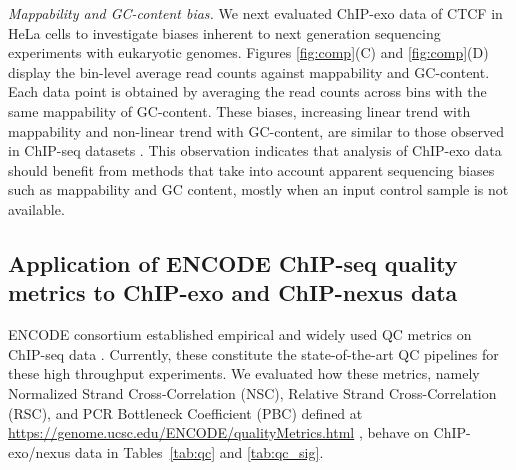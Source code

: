 \documentclass{bmcart}
\begin{document}
\textit{Mappability and GC-content bias.} We next evaluated ChIP-exo data of CTCF in HeLa cells
\cite{exo1} to investigate biases inherent to next generation sequencing experiments with eukaryotic genomes. 
Figures \ref{fig:comp}(C) and
\ref{fig:comp}(D) display the bin-level average read counts against
mappability and GC-content. Each data point is obtained by averaging
the read counts across bins with the same mappability of GC-content. 
These biases, increasing linear trend with mappability and non-linear trend with GC-content, are similar to those observed in ChIP-seq datasets \cite{benjamini2011, mosaics,quest}.
This observation  indicates that analysis of  ChIP-exo data
should benefit from methods that take into account  apparent
sequencing biases such as mappability and GC content, mostly when an
input  control sample is not available.

\subsection*{Application of ENCODE ChIP-seq quality metrics   to ChIP-exo and
  ChIP-nexus data}

ENCODE consortium established empirical and widely used QC metrics on ChIP-seq data
\cite{encode_qc}. Currently, these constitute the state-of-the-art QC pipelines for these high throughput experiments.
We evaluated how these metrics, namely Normalized Strand
Cross-Correlation (NSC), Relative Strand Cross-Correlation (RSC), and PCR
Bottleneck Coefficient (PBC) defined at 
\url{https://genome.ucsc.edu/ENCODE/qualityMetrics.html} \cite{encode_qc}, behave
 on ChIP-exo/nexus data in  Tables~\ref{tab:qc} and \ref{tab:qc_sig}.
\end{document}
